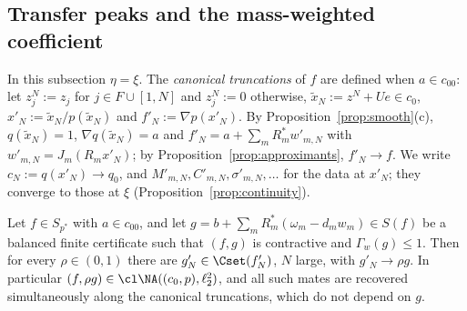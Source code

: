 \subsection{Transfer peaks and the mass-weighted coefficient}
In this subsection $\eta=\xi$.  The \emph{canonical truncations} of $f$
are defined when $a\in c_{00}$: let $z^N_j:=z_j$ for $j\in F\cup[1,N]$ and
$z^N_j:=0$ otherwise, $\tilde x_N:=z^N+Ue\in c_0$, $x'_N:=\tilde
x_N/p(\tilde x_N)$ and $f'_N:=\nabla p(x'_N)$.  By
Proposition~\ref{prop:smooth}(c), $q(\tilde x_N)=1$, $\nabla q(\tilde
x_N)=a$ and $f'_N=a+\sum_mR_m^*w'_{m,N}$ with $w'_{m,N}=J_m(R_mx'_N)$; by
Proposition~\ref{prop:approximants}, $f'_N\to f$.  We write
$c_N:=q(x'_N)\to q_0$, and $M'_{m,N},C'_{m,N},\sigma'_{m,N},\dots$ for the
data at $x'_N$; they converge to those at $\xi$
(Proposition~\ref{prop:continuity}).

\begin{theorem}\label{thm:transfer}
Let $f\in S_{p^*}$ with $a\in c_{00}$, and let
$g=b+\sum_mR_m^*(\omega_m-d_mw_m)\in S(f)$ be a balanced finite certificate
such that $(f,g)$ is contractive and $\Gamma_w(g)\le1$.  Then for every
$\rho\in(0,1)$ there are $g'_N\in\Cset(f'_N)$, $N$ large, with
$g'_N\to\rho g$.  In particular $(f,\rho g)\in\cl\NA((c_0,p),\ell_2^2)$, and
all such mates are recovered simultaneously along the canonical truncations,
which do not depend on $g$.
\end{theorem}

